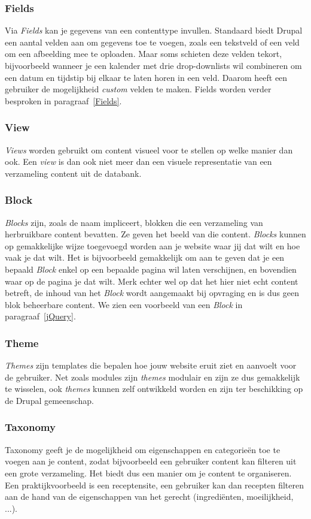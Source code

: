 \subsubsection{Fields}
Via \textit{Fields} kan je gegevens van een contenttype invullen. Standaard biedt Drupal een aantal velden aan om gegevens toe te voegen, zoals een tekstveld of een veld om een afbeelding mee te oploaden. Maar soms schieten deze velden tekort, bijvoorbeeld wanneer je een kalender met drie drop-downlists wil combineren om een datum en tijdstip bij elkaar te laten horen in een veld. Daarom heeft een gebruiker de mogelijkheid \textit{custom} velden te maken. Fields worden verder besproken in paragraaf~\ref{Fields}.

\subsubsection{View}
\textit{Views} worden gebruikt om content visueel voor te stellen op welke manier dan ook. Een \textit{view} is dan ook niet meer dan een visuele representatie van een verzameling content uit de databank.

\subsubsection{Block}
\textit{Blocks} zijn, zoals de naam impliceert, blokken die een verzameling van herbruikbare content bevatten. Ze geven het beeld van die content. \textit{Blocks} kunnen op gemakkelijke wijze toegevoegd worden aan je website waar jij dat wilt en hoe vaak je dat wilt. Het is bijvoorbeeld gemakkelijk om aan te geven dat je een bepaald \textit{Block} enkel op een bepaalde pagina wil laten verschijnen, en bovendien waar op de pagina je dat wilt. Merk echter wel op dat het hier niet echt content betreft, de inhoud van het \textit{Block} wordt aangemaakt bij opvraging en is dus geen blok beheerbare content. We zien een voorbeeld van een \textit{Block} in paragraaf~\ref{jQuery}.

\subsubsection{Theme}
\textit{Themes} zijn templates die bepalen hoe jouw website eruit ziet en aanvoelt voor de gebruiker. Net zoals modules zijn \textit{themes} modulair en zijn ze dus gemakkelijk te wisselen, ook \textit{themes} kunnen zelf ontwikkeld worden en zijn ter beschikking op de Drupal gemeenschap.

\subsubsection{Taxonomy}
Taxonomy geeft je de mogelijkheid om eigenschappen en categorie\"{e}n toe te voegen aan je content, zodat bijvoorbeeld een gebruiker content kan filteren uit een grote verzameling. Het biedt dus een manier om je content te organiseren. Een praktijkvoorbeeld is een receptensite, een gebruiker kan dan recepten filteren aan de hand van de eigenschappen van het gerecht (ingredi\"{e}nten, moeilijkheid, ...).

